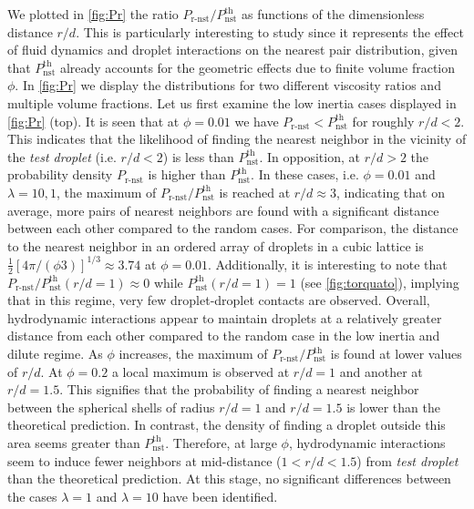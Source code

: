 We plotted in \ref{fig:Pr} the ratio $P_\text{r-nst}/P_\text{nst}^\text{th}$ as functions of the dimensionless distance $r/d$.
This is particularly interesting to study since it represents the effect of fluid dynamics and droplet interactions on the nearest pair distribution, given that $P_\text{nst}^\text{th}$ already accounts for the geometric effects due to finite volume fraction $\phi$. 
In \ref{fig:Pr} we display the distributions for two different viscosity ratios and multiple volume fractions. 
Let us first examine the low inertia cases displayed in \ref{fig:Pr} (top). 
It is seen that at $\phi = 0.01$ we have $P_\text{r-nst} < P_\text{nst}^\text{th}$ for roughly $r/d < 2$.
This indicates that the likelihood of finding the nearest neighbor in the vicinity of the \textit{test droplet} (i.e. $r/d<2$) is less than $P_\text{nst}^\text{th}$.
In opposition, at $r/d>2$ the probability density $P_\text{r-nst}$ is higher than $P_\text{nst}^\text{th}$.
In these cases, i.e. $\phi = 0.01$ and $\lambda = 10, 1$, the maximum of $P_\text{r-nst}/P_\text{nst}^\text{th}$ is reached at $r/d \approx 3$, indicating that on average, more pairs of nearest neighbors are found with a significant distance between each other compared to the random cases. 
For comparison, the distance to the nearest neighbor in an ordered array of droplets in a cubic lattice is  $\frac{1}{2}\left[4\pi/(\phi 3)\right]^{1/3} \approx 3.74$ at $\phi = 0.01$.
Additionally, it is interesting to note that $P_\text{r-nst}/P_\text{nst}^\text{th}(r/d =1) \approx 0$ while $P_\text{nst}^\text{th}(r/d =1) = 1$ (see \ref{fig:torquato}), implying that in this regime, very few droplet-droplet contacts are observed. 
Overall, hydrodynamic interactions appear to maintain droplets at a relatively greater distance from each other compared to the random case in the low inertia and dilute regime.
As $\phi$ increases, the maximum of $P_\text{r-nst}/P_\text{nst}^\text{th}$ is found at lower values of $r/d$. 
At $\phi = 0.2$ a local maximum is observed at $r/d = 1$ and another at $r/d = 1.5$.
This signifies that the probability of finding a nearest neighbor between the spherical shells of radius $r/d = 1$ and $r/d = 1.5$ is lower than the theoretical prediction.
In contrast, the density of finding a droplet outside this area seems greater than $P_\text{nst}^\text{th}$. 
Therefore, at large $\phi$, hydrodynamic interactions seem to induce fewer neighbors at mid-distance ($1<r/d<1.5$) from \textit{test droplet} than the theoretical prediction. 
At this stage, no significant differences between the cases $\lambda = 1$ and $\lambda = 10$ have been identified.

